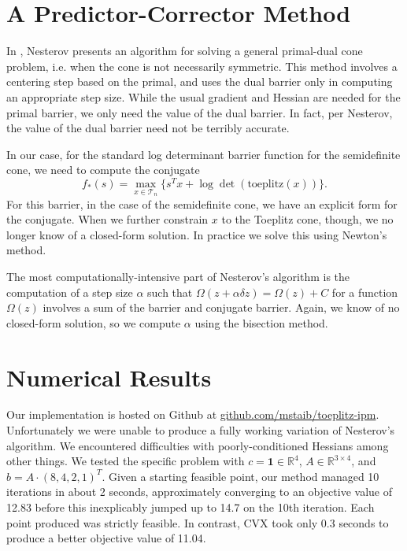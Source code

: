 \documentclass{article}
\begin{document}
\section{A Predictor-Corrector Method}
In , Nesterov presents an algorithm for solving a general
primal-dual cone problem, i.e. when the cone is not necessarily symmetric. This
method involves a centering step based on the primal, and uses the dual barrier
only in computing an appropriate step size. While the usual gradient and
Hessian are needed for the primal barrier, we only need the value of the dual
barrier. In fact, per Nesterov, the value of the dual barrier need not be terribly accurate.

In our case, for the standard log determinant barrier function for the semidefinite cone, we need to compute the conjugate
\begin{equation}
f_*(s) = \max_{x \in \mathcal T_n} \{ s^T x + \log\det(\text{toeplitz}(x))\}.
\end{equation}
For this barrier, in the case of the semidefinite cone, we have an explicit
form for the conjugate. When we further constrain $x$ to the Toeplitz cone,
though, we no longer know of a closed-form solution. In practice we solve this
using Newton's method.

The most computationally-intensive part of Nesterov's algorithm is the
computation of a step size $\alpha$ such that $\Omega(z + \alpha \delta z) =
\Omega(z) + C$ for a function $\Omega(z)$ involves a sum of the barrier and
conjugate barrier. Again, we know of no closed-form solution, so we compute
$\alpha$ using the bisection method.


\section{Numerical Results}
Our implementation is hosted on Github at \url{github.com/mstaib/toeplitz-ipm}.
Unfortunately we were unable to produce a fully working variation of Nesterov's
algorithm. We encountered difficulties with poorly-conditioned Hessians among
other things. We tested the specific problem with $c = \mathbf 1 \in \mathbb
R^4$, $A \in \mathbb R^{3\times 4}$, and $b = A \cdot (8,4,2,1)^T$. Given a
starting feasible point, our method managed 10 iterations in about 2 seconds,
approximately converging to an objective value of 12.83 before this
inexplicably jumped up to 14.7 on the 10th iteration. Each point produced was
strictly feasible. In contrast, CVX took only 0.3 seconds to produce a better
objective value of 11.04.

\newpage

\end{document}
